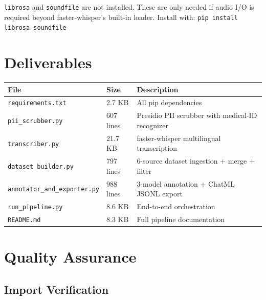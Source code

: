 \documentclass[11pt,a4paper]{article}
\begin{document}
\begin{tcolorbox}[warnBox={Missing Packages}]
\texttt{librosa} and \texttt{soundfile} are not installed. These are only needed if audio I/O is required beyond faster-whisper's built-in loader. Install with: \texttt{pip install librosa soundfile}
\end{tcolorbox}

\section{Deliverables}

\begin{center}
\begin{tcolorbox}[colback=white, colframe=indigodark, enhanced, breakable, title=File Deliverables, fonttitle=\sffamily\bfseries]
\begin{tabular}{>{\ttfamily}p{3.5cm}p{2cm}p{7cm}}
\toprule
\textbf{File} & \textbf{Size} & \textbf{Description} \\
\midrule
\texttt{requirements.txt} & 2.7 KB & All pip dependencies \\
\texttt{pii\_scrubber.py} & 607 lines & Presidio PII scrubber with medical-ID recognizer \\
\texttt{transcriber.py} & 21.7 KB & faster-whisper multilingual transcription \\
\texttt{dataset\_builder.py} & 797 lines & 6-source dataset ingestion + merge + filter \\
\texttt{annotator\_and\_exporter.py} & 988 lines & 3-model annotation + ChatML JSONL export \\
\texttt{run\_pipeline.py} & 8.6 KB & End-to-end orchestration \\
\texttt{README.md} & 8.3 KB & Full pipeline documentation \\
\bottomrule
\end{tabular}
\end{tcolorbox}
\end{center}

\section{Quality Assurance}

\subsection{Import Verification}
\end{document}
